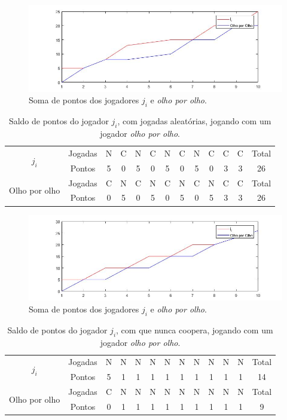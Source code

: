 \begin{figure}[H]
\centering
\includegraphics[width=14cm]{graf5.jpg}
\caption{Soma de pontos dos jogadores $j_i$ e \textit{olho por olho}.}
\label{fig5}
\end{figure}

\begin{table}[H]
\centering
\begin{tabular}{|c|c|c|c|c|c|c|c|c|c|c|c|c|}\hline
\multirow{2}{*}{$j_i$} & Jogadas & N & C & N & C & N & C & N & C &	C &	C & Total\\\cline{2-12}
 & Pontos & 5 & 0 & 5 & 0 & 5 & 0 & 5 & 0 & 3 & 3 & 26\\\hline\hline
\multirow{2}{*}{Olho por olho} & Jogadas & C & N & C & N & C & N & C & N &	C &	C & Total\\\cline{2-12}
 & Pontos & 0 & 5 & 0 & 5 & 0 & 5 & 0 & 5 & 3 & 3 & 26\\\hline
\end{tabular}
\caption{Saldo de pontos do jogador $j_i$, com jogadas aleatórias, jogando com um jogador \textit{olho por olho}.}
\label{tab6}
\end{table}

\begin{figure}[H]
\centering
\includegraphics[width=14cm]{graf6.jpg}
\caption{Soma de pontos dos jogadores $j_i$ e \textit{olho por olho}.}
\label{fig6}
\end{figure}

\begin{table}[H]
\centering
\begin{tabular}{|c|c|c|c|c|c|c|c|c|c|c|c|c|}\hline
\multirow{2}{*}{$j_i$} & Jogadas & N & N & N & N & N & N & N & N &	N &	N & Total\\\cline{2-12}
 & Pontos & 5 & 1 & 1 & 1 & 1 & 1 & 1 & 1 & 1 & 1 & 14\\\hline\hline
\multirow{2}{*}{Olho por olho} & Jogadas & C & N & N & N & N & N & N & N &	N &	N & Total\\\cline{2-12}
 & Pontos & 0 & 1 & 1 & 1 & 1 & 1 & 1 & 1 & 1 & 1 & 9\\\hline
\end{tabular}
\caption{Saldo de pontos do jogador $j_i$, com que nunca coopera, jogando com um jogador \textit{olho por olho}.}
\label{tab7}
\end{table}

